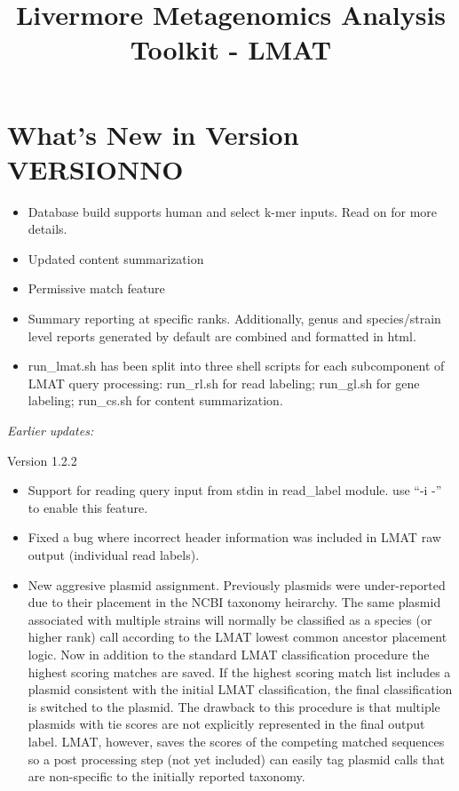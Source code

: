 \documentclass[11pt]{article}
\title{Livermore Metagenomics Analysis Toolkit - LMAT}
\newcommand{\lmatver}{VERSIONNO}
\begin{document}
\maketitle
\tableofcontents

\section{What's New in Version \lmatver}
\begin{itemize}
\item 
Database build supports human and select k-mer inputs.  Read on for more details.
\item 
Updated content summarization
\item
Permissive match feature
\item
Summary reporting at specific ranks.  Additionally, genus and species/strain level reports generated by default are combined and formatted in html.
\item
run\_lmat.sh has been split into three shell scripts for each subcomponent of LMAT query processing:  run\_rl.sh for read labeling;  run\_gl.sh for gene labeling;  run\_cs.sh for content summarization.



\end{itemize}

{\it Earlier updates:}

Version 1.2.2
\begin{itemize} 
\item
Support for reading query input from stdin in read\_label module.  use ``-i -'' to enable this feature.
\item
Fixed a bug where incorrect header information was included in LMAT raw output (individual read labels).
\item New aggresive plasmid assignment.  Previously plasmids were under-reported due to their placement in the NCBI taxonomy heirarchy. The same plasmid associated with multiple strains will normally be classified as a species (or higher rank) call according to the LMAT lowest common ancestor placement logic. Now in addition to the standard LMAT classification procedure the highest scoring matches are saved.  If the highest scoring match list includes a plasmid consistent with the initial LMAT classification, the final classification is switched to the plasmid.  The drawback
to this procedure is that multiple plasmids with tie scores are not explicitly represented in the final output label. LMAT, however, saves the scores of the competing matched sequences so a post processing step (not yet included) can easily tag plasmid calls that are non-specific to the initially reported taxonomy. \end{itemize}
\end{document}
